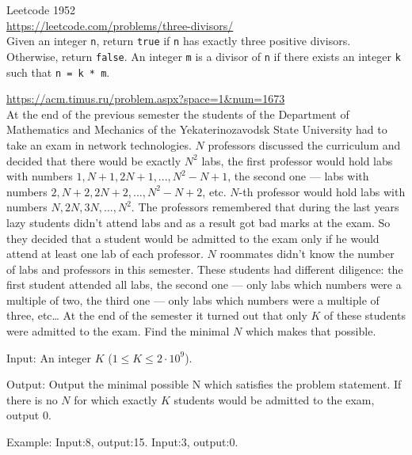 \begin{ex}
  Leetcode 1952\\
  \url{https://leetcode.com/problems/three-divisors/}\\
  Given an integer \verb!n!, return \verb!true! if \verb!n! has exactly three
  positive divisors. Otherwise, return \verb!false!.
  An integer \verb!m! is a divisor of \verb!n!
  if there exists an integer \verb!k! such that \verb!n = k * m!.
\end{ex}


\begin{ex}
  \url{https://acm.timus.ru/problem.aspx?space=1&num=1673}\\
  At the end of the previous semester the students of the
  Department of Mathematics and Mechanics of the Yekaterinozavodsk State
  University had to take an exam in network technologies.
  $N$ professors discussed the curriculum and decided that there would be
  exactly $N^2$ labs, the first professor would hold labs with numbers
  $1, N + 1, 2N + 1, ..., N^2 - N + 1$, the second one — labs with numbers
  $2, N + 2, 2N + 2, ..., N^2 - N + 2$, etc.
  $N$-th professor would hold labs with numbers
  $N, 2N, 3N, ..., N^2$.
  The professors remembered that during the last years lazy students didn't
  attend labs and as a result got bad marks at the exam.
  So they decided that a student would be admitted to the exam only if
  he would attend at least one lab of each professor.
  $N$ roommates didn't know the number of labs and professors in this semester.
  These students had different diligence: the first student attended all labs,
  the second one — only labs which numbers were a multiple of two,
  the third one — only labs which numbers were a multiple of three, etc…
  At the end of the semester it turned out that only $K$ of these students
  were admitted to the exam. Find the minimal $N$ which makes that possible.

  Input:
  An integer $K$ ($1 \leq K \leq 2 \cdot 10^9$).
  
  Output:
  Output the minimal possible N which satisfies the problem statement.
  If there is no $N$ for which exactly $K$ students would be admitted to the
  exam, output 0.

  Example:
  Input:8, output:15.
  Input:3, output:0.

\end{ex}
